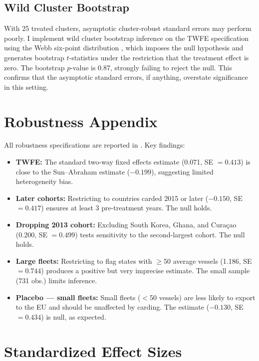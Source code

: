\documentclass[12pt]{article}
\begin{document}
\subsection{Wild Cluster Bootstrap}

With 25 treated clusters, asymptotic cluster-robust standard errors may perform poorly. I implement wild cluster bootstrap inference on the TWFE specification using the Webb six-point distribution \citep{roodman2019fast}, which imposes the null hypothesis and generates bootstrap $t$-statistics under the restriction that the treatment effect is zero. The bootstrap $p$-value is 0.87, strongly failing to reject the null. This confirms that the asymptotic standard errors, if anything, overstate significance in this setting.


\section{Robustness Appendix}
\label{app:robustness}

All robustness specifications are reported in . Key findings:

\begin{itemize}
\item \textbf{TWFE:} The standard two-way fixed effects estimate (0.071, SE $= 0.413$) is close to the Sun--Abraham estimate ($-0.199$), suggesting limited heterogeneity bias.
\item \textbf{Later cohorts:} Restricting to countries carded 2015 or later ($-0.150$, SE $= 0.417$) ensures at least 3 pre-treatment years. The null holds.
\item \textbf{Dropping 2013 cohort:} Excluding South Korea, Ghana, and Cura\c{c}ao (0.200, SE $= 0.499$) tests sensitivity to the second-largest cohort. The null holds.
\item \textbf{Large fleets:} Restricting to flag states with $\geq$50 average vessels (1.186, SE $= 0.744$) produces a positive but very imprecise estimate. The small sample (731 obs.) limits inference.
\item \textbf{Placebo --- small fleets:} Small fleets ($<$50 vessels) are less likely to export to the EU and should be unaffected by carding. The estimate ($-0.130$, SE $= 0.434$) is null, as expected.
\end{itemize}


\section{Standardized Effect Sizes}
\label{sec:sde}


\end{document}
